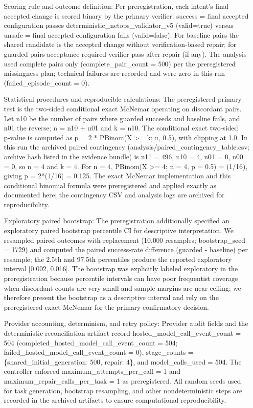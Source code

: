 \documentclass[conference]{IEEEtran}
\begin{document}
Scoring rule and outcome definition: Per preregistration, each intent's final accepted change is scored binary by the primary verifier: success = final accepted configuration passes deterministic\_netops\_validator\_v5 (valid=true) versus unsafe = final accepted configuration fails (valid=false). For baseline pairs the shared candidate is the accepted change without verification‑based repair; for guarded pairs acceptance required verifier pass after repair (if any). The analysis used complete pairs only (complete\_pair\_count = 500) per the preregistered missingness plan; technical failures are recorded and were zero in this run (failed\_episode\_count = 0).

Statistical procedures and reproducible calculations: The preregistered primary test is the two‑sided conditional exact McNemar operating on discordant pairs. Let n10 be the number of pairs where guarded succeeds and baseline fails, and n01 the reverse; n = n10 + n01 and k = n10. The conditional exact two‑sided p‑value is computed as p = 2 * PBinom(X >= k; n, 0.5), with clipping at 1.0. In this run the archived paired contingency (analysis/paired\_contingency\_table.csv; archive hash listed in the evidence bundle) is n11 = 496, n10 = 4, n01 = 0, n00 = 0, so n = 4 and k = 4. For n = 4, PBinom(X >= 4; n = 4, p = 0.5) = (1/16), giving p = 2*(1/16) = 0.125. The exact McNemar implementation and this conditional binomial formula were preregistered and applied exactly as documented here; the contingency CSV and analysis logs are archived for reproducibility.

Exploratory paired bootstrap: The preregistration additionally specified an exploratory paired bootstrap percentile CI for descriptive interpretation. We resampled paired outcomes with replacement (10,000 resamples; bootstrap\_seed = 1729) and computed the paired success‑rate difference (guarded - baseline) per resample; the 2.5th and 97.5th percentiles produce the reported exploratory interval [0.002, 0.016]. The bootstrap was explicitly labeled exploratory in the preregistration because percentile intervals can have poor frequentist coverage when discordant counts are very small and sample margins are near ceiling; we therefore present the bootstrap as a descriptive interval and rely on the preregistered exact McNemar for the primary confirmatory decision.

Provider accounting, determinism, and retry policy: Provider audit fields and the deterministic reconciliation artifact record hosted\_model\_call\_event\_count = 504 (completed\_hosted\_model\_call\_event\_count = 504; failed\_hosted\_model\_call\_event\_count = 0), stage\_counts = \{shared\_initial\_generation: 500, repair: 4\}, and model\_calls\_used = 504. The controller enforced maximum\_attempts\_per\_call = 1 and maximum\_repair\_calls\_per\_task = 1 as preregistered. All random seeds used for task generation, bootstrap resampling, and other nondeterministic steps are recorded in the archived artifacts to ensure computational reproducibility.
\end{document}
